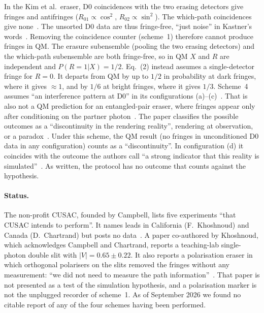 In the Kim et al.\ eraser, D0 coincidences with the two erasing detectors give
fringes and antifringes ($R_{01}\propto\cos^2$, $R_{02}\propto\sin^2$). The
which-path coincidences give none~\cite[Eq.~(10)]{Kim2000delayed}. The unsorted
D0 data are thus fringe-free, ``just noise'' in Kastner's
words~\cite{Kastner2019delayed}. Removing the coincidence counter (scheme~1)
therefore cannot produce fringes in QM. The erasure subensemble (pooling the two erasing detectors) and the
which-path subensemble are both fringe-free, so in QM $X$ and $R$ are independent and
$P(R{=}1|X)=1/2$. Eq.~(2)
instead assumes a single-detector fringe for $R=0$. It departs from QM by up to
$1/2$ in probability at dark fringes, where it gives $\approx1$, and by $1/6$ at
bright fringes, where it gives $1/3$. Scheme~4 assumes ``an interference pattern
at D0'' in its configurations (a)--(c)~\cite[p.~91]{Campbell2017on}. That is
also not a QM prediction for an entangled-pair eraser, where fringes appear
only after conditioning on the partner
photon~\cite{Ma2013quantum,Kastner2019delayed}. The paper classifies the
possible outcomes as a ``discontinuity in the rendering reality'', rendering at
observation, or a paradox~\cite[p.~91]{Campbell2017on}. Under this scheme, the
QM result (no fringes in unconditioned D0 data in any configuration) counts as
a ``discontinuity''. In configuration (d) it coincides with the outcome the
authors call ``a strong indicator that this reality is
simulated''~\cite[p.~92]{Campbell2017on}. As written, the protocol has no
outcome that counts against the hypothesis.

\paragraph{Status.}
The non-profit CUSAC, founded by Campbell, lists five experiments ``that CUSAC
intends to perform''. It names leads in California (F.\ Khoshnoud) and Canada
(D.\ Chartrand) but posts no data~\cite{CUSAC2024experiments}. A paper
co-authored by Khoshnoud, which acknowledges Campbell and Chartrand, reports a
teaching-lab single-photon double slit with $|V|=0.65\pm0.22$. It also reports a
polarisation eraser in which orthogonal polarisers on the slits removed the
fringes without any measurement: ``we did not need to measure the path
information''~\cite{Luo2024young}. That paper is not presented as a test of the
simulation hypothesis, and a polarisation marker is not the unplugged recorder
of scheme~1. As of September 2026 we found no citable report of any of the four
schemes having been performed.

